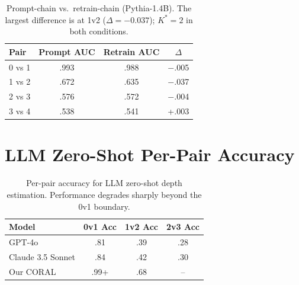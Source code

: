 \documentclass[11pt,a4paper]{article}
\begin{document}
\begin{table}[h]
\centering
\small
\begin{tabular}{lccc}
\toprule
\textbf{Pair} & \textbf{Prompt AUC} & \textbf{Retrain AUC} & $\Delta$ \\
\midrule
0 vs 1 & .993 & .988 & $-$.005 \\
1 vs 2 & .672 & .635 & $-$.037 \\
2 vs 3 & .576 & .572 & $-$.004 \\
3 vs 4 & .538 & .541 & +.003 \\
\bottomrule
\end{tabular}
\caption{Prompt-chain vs.\ retrain-chain (Pythia-1.4B). The largest difference is at 1v2 ($\Delta=-0.037$); $K^*=2$ in both conditions.}
\end{table}

\section{LLM Zero-Shot Per-Pair Accuracy}
\label{app:llm}

\begin{table}[h]
\centering
\small
\begin{tabular}{lccc}
\toprule
\textbf{Model} & \textbf{0v1 Acc} & \textbf{1v2 Acc} & \textbf{2v3 Acc} \\
\midrule
GPT-4o & .81 & .39 & .28 \\
Claude 3.5 Sonnet & .84 & .42 & .30 \\
Our CORAL & .99+ & .68 & -- \\
\bottomrule
\end{tabular}
\caption{Per-pair accuracy for LLM zero-shot depth estimation. Performance degrades sharply beyond the 0v1 boundary.}
\end{table}
\end{document}
